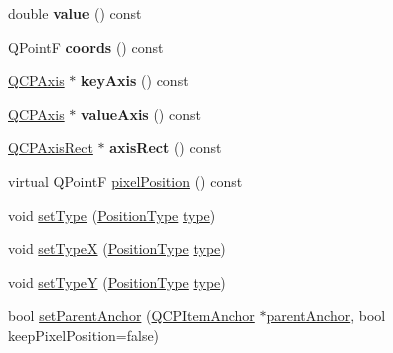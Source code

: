 \begin{DoxyCompactItemize}
double {\bfseries value} () const
\item 
\mbox{\label{class_q_c_p_item_position_aa4ecf5b04c67049c05d37619e090820b}} 
Q\+PointF {\bfseries coords} () const
\item 
\mbox{\label{class_q_c_p_item_position_a9ad34861fbfd8be8b8270c16f879169c}} 
\mbox{\hyperlink{class_q_c_p_axis}{Q\+C\+P\+Axis}} $\ast$ {\bfseries key\+Axis} () const
\item 
\mbox{\label{class_q_c_p_item_position_a356ac94e7e73d88deb7f2841c0d0c734}} 
\mbox{\hyperlink{class_q_c_p_axis}{Q\+C\+P\+Axis}} $\ast$ {\bfseries value\+Axis} () const
\item 
\mbox{\label{class_q_c_p_item_position_ae4081cfe7575f922f403c6e3a2ce7891}} 
\mbox{\hyperlink{class_q_c_p_axis_rect}{Q\+C\+P\+Axis\+Rect}} $\ast$ {\bfseries axis\+Rect} () const
\item 
virtual Q\+PointF \mbox{\hyperlink{class_q_c_p_item_position_a3b5a12a8e5081c1a5bb878ffdcfa92ad}{pixel\+Position}} () const
\item 
void \mbox{\hyperlink{class_q_c_p_item_position_aa476abf71ed8fa4c537457ebb1a754ad}{set\+Type}} (\mbox{\hyperlink{class_q_c_p_item_position_aad9936c22bf43e3d358552f6e86dbdc8}{Position\+Type}} \mbox{\hyperlink{class_q_c_p_item_position_abfd74d86bd799306ce0295ffe433bdfc}{type}})
\item 
void \mbox{\hyperlink{class_q_c_p_item_position_a2113b2351d6d00457fb3559a4e20c3ea}{set\+TypeX}} (\mbox{\hyperlink{class_q_c_p_item_position_aad9936c22bf43e3d358552f6e86dbdc8}{Position\+Type}} \mbox{\hyperlink{class_q_c_p_item_position_abfd74d86bd799306ce0295ffe433bdfc}{type}})
\item 
void \mbox{\hyperlink{class_q_c_p_item_position_ac2a454aa5a54c1615c50686601ec4510}{set\+TypeY}} (\mbox{\hyperlink{class_q_c_p_item_position_aad9936c22bf43e3d358552f6e86dbdc8}{Position\+Type}} \mbox{\hyperlink{class_q_c_p_item_position_abfd74d86bd799306ce0295ffe433bdfc}{type}})
\item 
bool \mbox{\hyperlink{class_q_c_p_item_position_ac094d67a95d2dceafa0d50b9db3a7e51}{set\+Parent\+Anchor}} (\mbox{\hyperlink{class_q_c_p_item_anchor}{Q\+C\+P\+Item\+Anchor}} $\ast$\mbox{\hyperlink{class_q_c_p_item_position_a0a87f9dce1af6cc9b510785991bcf1c6}{parent\+Anchor}}, bool keep\+Pixel\+Position=false)

\end{DoxyCompactItemize}
